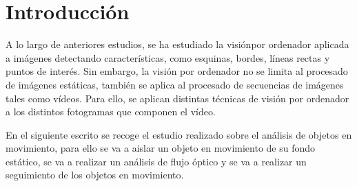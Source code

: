\documentclass[a4paper,12pt]{article}
\newcommand{\vacio}{\textcolor{white}{ .}}
\begin{document}
{%

\renewcommand{\headrulewidth}{0.5pt}


\pagestyle{fancy}
\renewcommand{\footrulewidth}{0.5pt}
\fancyfoot[C]{\vacio}

\newpage

\renewcommand{\contentsname}{Índice}
\tableofcontents
{}

\newpage


\newpage


\section{Introducción}


\vspace{1cm}

A lo largo de anteriores estudios, se ha estudiado la visiónpor ordenador aplicada a imágenes detectando características, como esquinas, bordes, líneas rectas y puntos de interés.
Sin embargo, la visión por ordenador no se limita al procesado de imágenes estáticas, también se aplica al procesado de secuencias de imágenes tales como vídeos. Para ello, se aplican
distintas técnicas de visión por ordenador a los distintos fotogramas que componen el vídeo.

\vspace{0.5cm}

En el siguiente escrito se recoge el estudio realizado sobre el análisis de objetos en movimiento, para ello se va a aislar un objeto en movimiento de su fondo estático, se va a realizar
un análisis de flujo óptico y se va a realizar un seguimiento de los objetos en movimiento.

\vspace{0.5cm}

}
\end{document}
